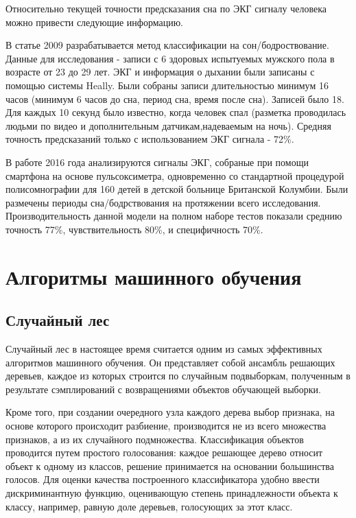 Относительно текущей точности предсказания сна по ЭКГ сигналу человека можно привести следующие информацию.

В статье \cite{sleep_accuracy_3} 2009 разрабатывается метод классификации на сон/бодроствование. Данные для исследования -  записи с 6 здоровых испытуемых мужского пола в возрасте от 23 до 29 лет. ЭКГ и информация о дыхании были записаны с помощью системы Heally. Были собраны записи длительностью минимум 16 часов  (минимум 6 часов до сна, период сна, время после сна). Записей было 18. Для каждых 10 секунд было известно, когда человек спал (разметка проводилась людьми по видео и дополнительным датчикам,надеваемым на ночь). Средняя точность предсказаний только с использованием ЭКГ сигнала - 72\%.

В работе \cite{sleep_accuracy_2} 2016 года анализируются сигналы ЭКГ, собраные при помощи смартфона на основе пульсоксиметра, одновременно со стандартной процедурой полисомнографии для 160 детей в детской больнице Британской Колумбии. Были размечены периоды сна/бодрствования на протяжении всего исследования. Производительность данной модели на полном наборе тестов показали среднию точность 77\%, чувствительность 80\%, и специфичность 70\%.

\section{Алгоритмы машинного обучения}
\subsection{Случайный лес}

Случайный лес \cite{random_forest} в настоящее время считается одним из самых эффективных алгоритмов машинного обучения. Он представляет собой ансамбль решающих деревьев, каждое из которых строится по случайным подвыборкам, полученным в результате сэмплирований с возвращениями объектов обучающей выборки.

Кроме того, при создании очередного узла каждого дерева выбор признака, на основе которого происходит разбиение, производится не из всего множества признаков, а из их случайного подмножества. Классификация объектов проводится путем простого голосования: каждое решающее дерево относит объект к одному из классов, решение принимается на основании большинства голосов. Для оценки качества построенного классификатора удобно ввести дискриминантную функцию, оценивающую степень принадлежности объекта к классу, например, равную доле деревьев, голосующих за этот класс.

